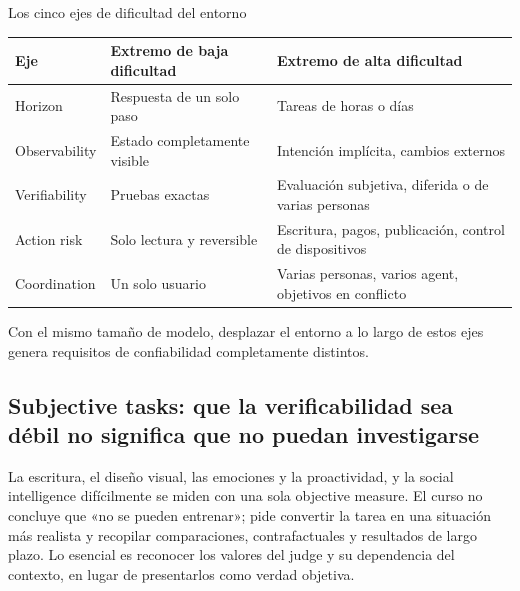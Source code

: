 
\begin{knowledgebox}{Los cinco ejes de dificultad del entorno}
\begin{tabularx}{\textwidth}{L{0.20\textwidth} X X}
\toprule
Eje & Extremo de baja dificultad & Extremo de alta dificultad \\
\midrule
Horizon & Respuesta de un solo paso & Tareas de horas o días \\
Observability & Estado completamente visible & Intención implícita, cambios externos \\
Verifiability & Pruebas exactas & Evaluación subjetiva, diferida o de varias personas \\
Action risk & Solo lectura y reversible & Escritura, pagos, publicación, control de dispositivos \\
Coordination & Un solo usuario & Varias personas, varios agent, objetivos en conflicto \\
\bottomrule
\end{tabularx}
Con el mismo tamaño de modelo, desplazar el entorno a lo largo de estos ejes genera requisitos de confiabilidad completamente distintos.
\end{knowledgebox}


\subsection{Subjective tasks: que la verificabilidad sea débil no significa que no puedan investigarse}

La escritura, el diseño visual, las emociones y la proactividad, y la social intelligence difícilmente se miden con una sola objective measure. El curso no concluye que «no se pueden entrenar»; pide convertir la tarea en una situación más realista y recopilar comparaciones, contrafactuales y resultados de largo plazo. Lo esencial es reconocer los valores del judge y su dependencia del contexto, en lugar de presentarlos como verdad objetiva.

